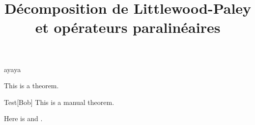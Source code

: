 \documentclass[11pt,a4paper]{article}
\title{\textbf{Décomposition de Littlewood-Paley et opérateurs paralinéaires }}
\date{}
\begin{document}
\maketitle
ayaya
\begin{theorem}\label{bob}
This is a theorem.
\end{theorem}

\begin{manualtheorem}{Test}[Bob]\label{foo}
This is a manual theorem.
\end{manualtheorem}

Here is  and .
\end{document}
